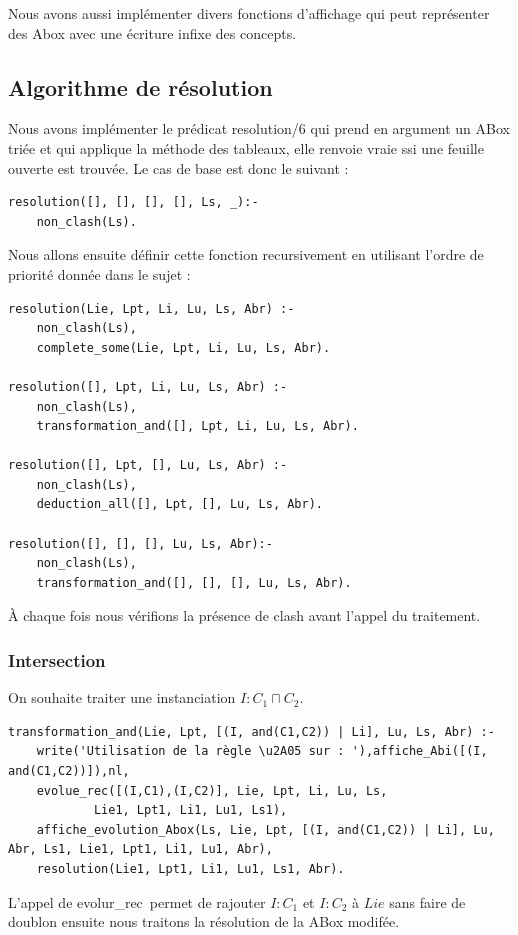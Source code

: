 \documentclass{article}
\begin{document}
Nous avons aussi implémenter divers fonctions d'affichage qui peut représenter des Abox avec une écriture infixe des concepts.
\subsection{Algorithme de résolution}
Nous avons implémenter le prédicat resolution/6 qui prend en argument un ABox triée et qui applique la méthode des tableaux, elle renvoie vraie ssi une feuille ouverte est trouvée. Le cas de base est donc le suivant :
\begin{verbatim}
resolution([], [], [], [], Ls, _):-
	non_clash(Ls).
\end{verbatim}

Nous allons ensuite définir cette fonction recursivement en utilisant l'ordre de priorité donnée dans le sujet :
\begin{verbatim}
resolution(Lie, Lpt, Li, Lu, Ls, Abr) :-
    non_clash(Ls),
    complete_some(Lie, Lpt, Li, Lu, Ls, Abr).
	
resolution([], Lpt, Li, Lu, Ls, Abr) :-
    non_clash(Ls),
    transformation_and([], Lpt, Li, Lu, Ls, Abr).
	
resolution([], Lpt, [], Lu, Ls, Abr) :-
    non_clash(Ls),
    deduction_all([], Lpt, [], Lu, Ls, Abr).
	
resolution([], [], [], Lu, Ls, Abr):-
	non_clash(Ls),
	transformation_and([], [], [], Lu, Ls, Abr).
\end{verbatim}

\`A chaque fois nous vérifions la présence de clash avant l'appel du traitement.

\subsubsection{Intersection}
On souhaite traiter une instanciation $I:C_1\sqcap C_2$.
\begin{verbatim}
transformation_and(Lie, Lpt, [(I, and(C1,C2)) | Li], Lu, Ls, Abr) :- 
	write('Utilisation de la règle \u2A05 sur : '),affiche_Abi([(I, and(C1,C2))]),nl,
	evolue_rec([(I,C1),(I,C2)], Lie, Lpt, Li, Lu, Ls,
            Lie1, Lpt1, Li1, Lu1, Ls1),
	affiche_evolution_Abox(Ls, Lie, Lpt, [(I, and(C1,C2)) | Li], Lu, Abr, Ls1, Lie1, Lpt1, Li1, Lu1, Abr),
	resolution(Lie1, Lpt1, Li1, Lu1, Ls1, Abr).
\end{verbatim}

L'appel de \color{blue}evolur\_rec\color{black}\ permet de rajouter $I:C_1$ et $I:C_2$ à $Lie$ sans faire de doublon ensuite nous traitons la résolution de la ABox modifée.
\end{document}
